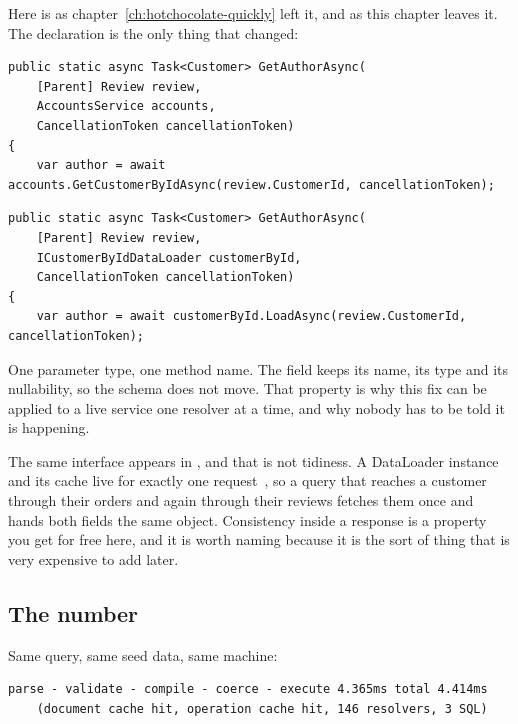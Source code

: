 %
Here is  as chapter~\ref{ch:hotchocolate-quickly} left it,
and as this chapter leaves it. The declaration is the only thing that changed:

\begin{verbatim}
public static async Task<Customer> GetAuthorAsync(
    [Parent] Review review,
    AccountsService accounts,
    CancellationToken cancellationToken)
{
    var author = await accounts.GetCustomerByIdAsync(review.CustomerId, cancellationToken);
\end{verbatim}

\begin{verbatim}
public static async Task<Customer> GetAuthorAsync(
    [Parent] Review review,
    ICustomerByIdDataLoader customerById,
    CancellationToken cancellationToken)
{
    var author = await customerById.LoadAsync(review.CustomerId, cancellationToken);
\end{verbatim}

One parameter type, one method name. The field keeps its name, its type and its
nullability, so the schema does not move. That property is why this fix can be
applied to a live service one resolver at a time, and why nobody has to be told
it is happening.

%
The same interface appears in , and that is not tidiness. A
DataLoader instance and its cache live for exactly one
request~\autocite{chillicream2026dataloaderdocs}, so a query that reaches a
customer through their orders and again through their reviews fetches them once
and hands both fields the same object. Consistency inside a response is a
property you get for free here, and it is worth naming because it is the sort of
thing that is very expensive to add later.

\subsection*{The number}

%
Same query, same seed data, same machine:

\begin{verbatim}
parse - validate - compile - coerce - execute 4.365ms total 4.414ms
    (document cache hit, operation cache hit, 146 resolvers, 3 SQL)
\end{verbatim}

